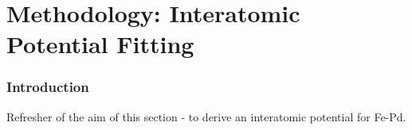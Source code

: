 \chapter{Methodology: Interatomic Potential Fitting}

\begin{changemargin}{1.0cm}{1.0cm}
\end{changemargin}



\subsection{Introduction}


Refresher of the aim of this section - to derive an interatomic potential for Fe-Pd.














